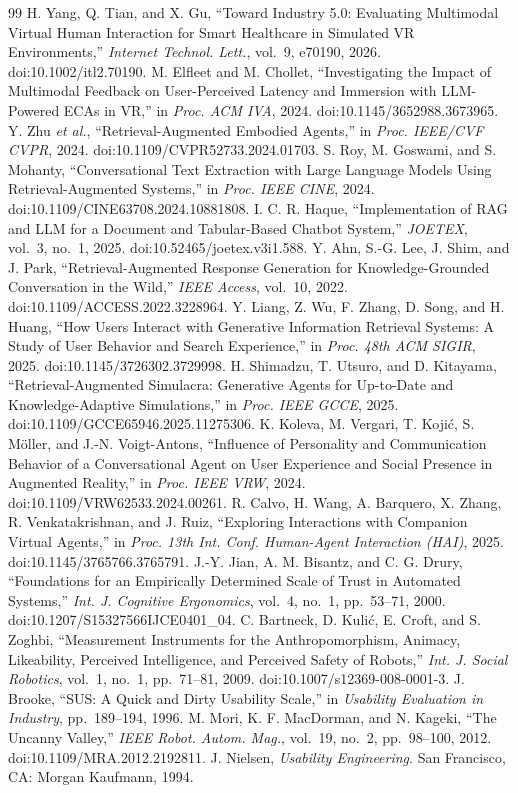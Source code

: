\documentclass[conference]{IEEEtran}
\begin{document}
\begin{thebibliography}{99}
 H. Yang, Q. Tian, and X. Gu, ``Toward Industry 5.0: Evaluating Multimodal Virtual Human Interaction for Smart Healthcare in Simulated VR Environments,'' \emph{Internet Technol. Lett.}, vol.\ 9, e70190, 2026. doi:10.1002/itl2.70190.
 M. Elfleet and M. Chollet, ``Investigating the Impact of Multimodal Feedback on User-Perceived Latency and Immersion with LLM-Powered ECAs in VR,'' in \emph{Proc. ACM IVA}, 2024. doi:10.1145/3652988.3673965.
 Y. Zhu \emph{et al.}, ``Retrieval-Augmented Embodied Agents,'' in \emph{Proc. IEEE/CVF CVPR}, 2024. doi:10.1109/CVPR52733.2024.01703.
 S. Roy, M. Goswami, and S. Mohanty, ``Conversational Text Extraction with Large Language Models Using Retrieval-Augmented Systems,'' in \emph{Proc. IEEE CINE}, 2024. doi:10.1109/CINE63708.2024.10881808.
 I. C. R. Haque, ``Implementation of RAG and LLM for a Document and Tabular-Based Chatbot System,'' \emph{JOETEX}, vol.\ 3, no.\ 1, 2025. doi:10.52465/joetex.v3i1.588.
 Y. Ahn, S.-G. Lee, J. Shim, and J. Park, ``Retrieval-Augmented Response Generation for Knowledge-Grounded Conversation in the Wild,'' \emph{IEEE Access}, vol.\ 10, 2022. doi:10.1109/ACCESS.2022.3228964.
 Y. Liang, Z. Wu, F. Zhang, D. Song, and H. Huang, ``How Users Interact with Generative Information Retrieval Systems: A Study of User Behavior and Search Experience,'' in \emph{Proc. 48th ACM SIGIR}, 2025. doi:10.1145/3726302.3729998.
 H. Shimadzu, T. Utsuro, and D. Kitayama, ``Retrieval-Augmented Simulacra: Generative Agents for Up-to-Date and Knowledge-Adaptive Simulations,'' in \emph{Proc. IEEE GCCE}, 2025. doi:10.1109/GCCE65946.2025.11275306.
 K. Koleva, M. Vergari, T. Koji\'{c}, S. M\"{o}ller, and J.-N. Voigt-Antons, ``Influence of Personality and Communication Behavior of a Conversational Agent on User Experience and Social Presence in Augmented Reality,'' in \emph{Proc. IEEE VRW}, 2024. doi:10.1109/VRW62533.2024.00261.
 R. Calvo, H. Wang, A. Barquero, X. Zhang, R. Venkatakrishnan, and J. Ruiz, ``Exploring Interactions with Companion Virtual Agents,'' in \emph{Proc. 13th Int. Conf. Human-Agent Interaction (HAI)}, 2025. doi:10.1145/3765766.3765791.
 J.-Y. Jian, A. M. Bisantz, and C. G. Drury, ``Foundations for an Empirically Determined Scale of Trust in Automated Systems,'' \emph{Int. J. Cognitive Ergonomics}, vol.\ 4, no.\ 1, pp.\ 53--71, 2000. doi:10.1207/S15327566IJCE0401\_04.
 C. Bartneck, D. Kuli\'{c}, E. Croft, and S. Zoghbi, ``Measurement Instruments for the Anthropomorphism, Animacy, Likeability, Perceived Intelligence, and Perceived Safety of Robots,'' \emph{Int. J. Social Robotics}, vol.\ 1, no.\ 1, pp.\ 71--81, 2009. doi:10.1007/s12369-008-0001-3.
 J. Brooke, ``SUS: A Quick and Dirty Usability Scale,'' in \emph{Usability Evaluation in Industry}, pp.\ 189--194, 1996.
 M. Mori, K. F. MacDorman, and N. Kageki, ``The Uncanny Valley,'' \emph{IEEE Robot. Autom. Mag.}, vol.\ 19, no.\ 2, pp.\ 98--100, 2012. doi:10.1109/MRA.2012.2192811.
 J. Nielsen, \emph{Usability Engineering}. San Francisco, CA: Morgan Kaufmann, 1994.
\end{thebibliography}
\end{document}
